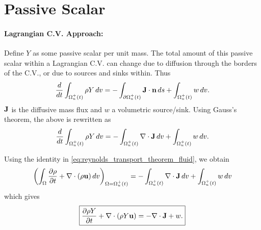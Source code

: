 \documentclass[oneside,a4paper,11pt]{report}
\begin{document}
\section{Passive Scalar}

\paragraph{Lagrangian C.V. Approach:}
Define $Y$ as some passive scalar per unit mass. The total amount of this passive scalar within a Lagrangian C.V. can change due to diffusion through the borders of the C.V., or due to sources and sinks within. Thus
\begin{equation}
\frac{d}{dt}\int_{\Omega^+_u(t)} \rho Y \,dv = -\int_{\partial \Omega^+_u(t)} \mathbf{J} \cdot \mathbf{n} \, ds + \int_{\Omega^+_u(t)} w \, dv.
\end{equation}
$\mathbf{J}$ is the diffusive mass flux and $w$ a volumetric source/sink. Using Gauss's theorem, the above is rewritten as 
\begin{equation}
\frac{d}{dt}\int_{\Omega^+_u(t)} \rho Y \,dv = -\int_{\Omega^+_u(t)} \nabla \cdot \mathbf{J} \, dv + \int_{\Omega^+_u(t)} w \, dv.
\end{equation}

Using the identity in \cref{eq:reynolds_transport_theorem_fluid}, we obtain
\begin{equation}
\left(\int_\Omega \frac{\partial\rho}{\partial t} + \nabla \cdot (\rho \mathbf{u}) \, dv \right)_{\Omega = \Omega^+_u(t)}= -\int_{\Omega^+_u(t)} \nabla \cdot \mathbf{J} \, dv  + \int_{\Omega^+_u(t)} w \, dv
\end{equation}
which gives
\begin{equation}
\boxed{\frac{\partial\rho Y}{\partial t}+\nabla \cdot (\rho Y \mathbf{u}) = -\nabla \cdot \mathbf{J} + w.}
\end{equation}
\end{document}
